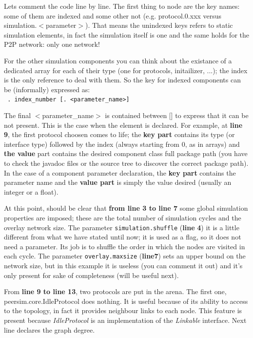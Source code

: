\documentclass[a4paper,11pt]{article}
\begin{document}
Lets comment the code line by line. The first thing to node are the
key names: some of them are indexed and some other not (e.g. protocol.0.xxx
versus simulation.$<$parameter$>$). That means the unindexed keys refers
to static simulation elements, in fact the simulation itself is one
and the same holds for the P2P network: only one network! 

For the other simulation components you can think about the existance
of a dedicated array for each of their type (one for protocols, initailizer,
...); the \textsf{index} is the only reference to deal with them.
So the key for indexed components can be (informally) expressed as:
\\


\texttt{ . index\_number
{[}. <parameter\_name>{]}}~\\
{\footnotesize \par}

The final $<$parameter\_name$>$ is contained between {[}{]} to express
that it can be not present. This is the case when the element is declared.
For example, at \textbf{line 9}, the first protocol choosen comes to life;
the \textbf{key part} contains its type (or interface type) followed
by the index (always starting from 0, as in arrays) and \textbf{the
value} part contains the desired component class full package path
(you have to check the javadoc files or the source tree to discover
the correct package path). In the case of a component parameter declaration,
the \textbf{key part} contains the parameter name and the \textbf{value
part} is simply the value desired (usually an integer or a float).

At this point, should be clear that \textbf{from line 3 to line 7}
some global simulation properties are imposed; these are the total
number of simulation cycles and the overlay network size. The parameter
\texttt{simulation.shuffle} (\textbf{line} \textbf{4}) it is a little
different from what we have stated until now; it is used as a flag,
so it does not need a parameter. Its job is to shuffle the order in
which the nodes are visited in each cycle. The parameter \texttt{overlay.maxsize}
(\textbf{line7}) sets an upper bound on the network size, but in this
example it is useless (you can comment it out) and it's only present
for sake of completeness (will be useful next). 

From \textbf{line 9 to line 13}, two protocols are put in the arena.
The first one, peersim.core.IdleProtocol does nothing. It is useful
because of its ability to access to the topology, in fact it provides
neighbour links to each node. This feature is present because \emph{IdleProtocol}
is an implementation of the \emph{Linkable} interface. Next line declares
the graph degree. 
\end{document}
